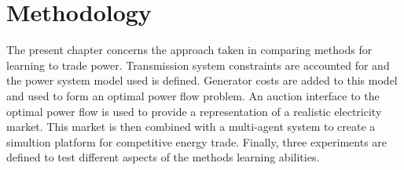 \chapter{Methodology}
\label{ch:method}
The present chapter concerns the approach taken in comparing methods for
learning to trade power.  Transmission system constraints are accounted for and
the power system model used is defined.  Generator costs are added to this
model and used to form an optimal power flow problem.  An auction interface to
the optimal power flow is used to provide a representation of a realistic
electricity market.  This market is then combined with a multi-agent system to
create a simultion platform for competitive energy trade.  Finally, three
experiments are defined to test different aspects of the methods learning
abilities.

%
%
